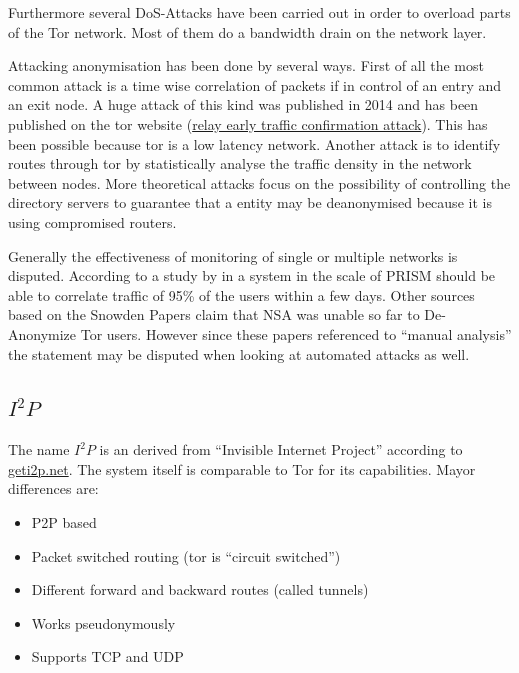 Furthermore several DoS-Attacks have been carried out in order to overload parts of the Tor network. Most of them do a bandwidth drain on the network layer.

Attacking anonymisation has been done by several ways. First of all the most common attack is a time wise correlation of packets if in control of an entry and an exit node. A huge attack of this kind was published in 2014 and has been published on the tor website (\href{https://blog.torproject.org/blog/tor-security-advisory-relay-early-traffic-confirmation-attack}{relay early traffic confirmation attack}). This has been possible because tor is a low latency network. Another attack is to identify routes through tor by statistically analyse the traffic density in the network between nodes. More theoretical attacks focus on the possibility of controlling the directory servers to guarantee that a entity may be deanonymised because it is using compromised routers.

Generally the effectiveness of monitoring of single or multiple networks is disputed. According to a study by \citeauthor{ccs2013-usersrouted} in \citeyear{ccs2013-usersrouted}\cite{ccs2013-usersrouted} a system in the scale of PRISM should be able to correlate traffic of 95\% of the users within a few days. Other sources based on the Snowden Papers claim that NSA was unable so far to De-Anonymize Tor users. However since these papers referenced to ``manual analysis'' the  statement may be disputed when looking at automated attacks as well.


\subsection{$I^2P$}
The name $I^2P$ is an derived from  ``Invisible Internet Project'' according to \href{https://geti2p.net/}{geti2p.net}. The system itself is comparable to Tor for its capabilities. Mayor differences are:
\begin{itemize}
	\item P2P based
	\item Packet switched routing (tor is ``circuit switched'')
	\item Different forward and backward routes (called tunnels)
	\item Works pseudonymously
	\item Supports TCP and UDP
\end{itemize}

